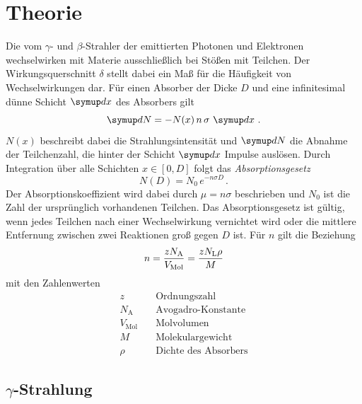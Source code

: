 \section{Theorie}
\label{sec:Theorie}

Die vom $\gamma$- und $\beta$-Strahler der emittierten Photonen und Elektronen
wechselwirken mit Materie ausschließlich bei Stößen mit Teilchen.
Der Wirkungsquerschnitt $\delta$ stellt dabei ein Maß für die Häufigkeit von Wechselwirkungen dar.
Für einen Absorber der Dicke $D$ und eine infinitesimal dünne Schicht $\dif{x}$ des Absorbers gilt
\begin{equation}
    \dif{N} = -N(x) \, n \, \sigma \, \dif{x} \, .
\end{equation}
$N(x)$ beschreibt dabei die Strahlungsintensität und $\dif{N}$ die Abnahme der Teilchenzahl,
die hinter der Schicht $\dif{x}$ Impulse auslösen.
Durch Integration über alle Schichten $x \in [0, D]$ folgt das \textit{Absorptionsgesetz}
\begin{equation} \label{eq:absorptionsgesetz}
    N(D) = N_\text{0} \, e^{-n \sigma D} \, .
\end{equation}
Der Absorptionskoeffizient wird dabei durch $\mu = n \sigma$ beschrieben und 
$N_\text{0}$ ist die Zahl der ursprünglich vorhandenen Teilchen.
Das Absorptionsgesetz ist gültig, wenn jedes Teilchen nach einer Wechselwirkung
vernichtet wird oder die mittlere Entfernung zwischen zwei Reaktionen groß gegen $D$ ist.
Für $n$ gilt die Beziehung
\begin{equation} \label{eq:anzahl}
    n = \frac{z N_\text{A}}{V_\text{Mol}} = \frac{z N_\text{L} \rho}{M} \\
\end{equation}
mit den Zahlenwerten
\begin{align*}
    z                &\quad \text{Ordnungszahl}         \\
    N_\text{A}       &\quad \text{Avogadro-Konstante}   \\
    V_\text{Mol}     &\quad \text{Molvolumen}           \\
    M                &\quad \text{Molekulargewicht}     \\
    \rho             &\quad \text{Dichte des Absorbers} 
\end{align*}

\subsection[Gamma-Strahlung]{$\gamma$-Strahlung}

